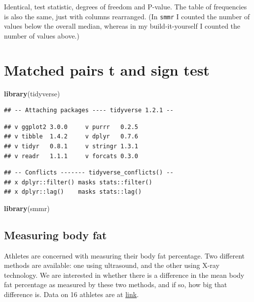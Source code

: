 \documentclass[]{tufte-book}
\newenvironment{Shaded}{}{}
\newcommand{\KeywordTok}[1]{\textcolor[rgb]{0.00,0.44,0.13}{\textbf{#1}}}
\newcommand{\NormalTok}[1]{#1}
\theoremstyle{definition}
\theoremstyle{definition}
\theoremstyle{definition}
\theoremstyle{remark}
\begin{document}
Identical, test statistic, degrees of freedom and P-value. The table of
frequencies is also the same, just with columns rearranged. (In
\texttt{smmr} I counted the number of values below the overall median,
whereas in my build-it-yourself I counted the number of values above.)

\hypertarget{matched-pairs-t-and-sign-test}{%
\chapter{Matched pairs t and sign
test}\label{matched-pairs-t-and-sign-test}}

\begin{Shaded}
\begin{Highlighting}[]
\KeywordTok{library}\NormalTok{(tidyverse)}
\end{Highlighting}
\end{Shaded}

\begin{verbatim}
## -- Attaching packages ---- tidyverse 1.2.1 --
\end{verbatim}

\begin{verbatim}
## v ggplot2 3.0.0     v purrr   0.2.5
## v tibble  1.4.2     v dplyr   0.7.6
## v tidyr   0.8.1     v stringr 1.3.1
## v readr   1.1.1     v forcats 0.3.0
\end{verbatim}

\begin{verbatim}
## -- Conflicts ------- tidyverse_conflicts() --
## x dplyr::filter() masks stats::filter()
## x dplyr::lag()    masks stats::lag()
\end{verbatim}

\begin{Shaded}
\begin{Highlighting}[]
\KeywordTok{library}\NormalTok{(smmr)}
\end{Highlighting}
\end{Shaded}

\hypertarget{measuring-body-fat}{%
\section{Measuring body fat}\label{measuring-body-fat}}

Athletes are concerned with measuring their body fat percentage. Two
different methods are available: one using ultrasound, and the other
using X-ray technology. We are interested in whether there is a
difference in the mean body fat percentage as measured by these two
methods, and if so, how big that difference is. Data on 16 athletes are
at \href{http://www.utsc.utoronto.ca/~butler/c32/bodyfat.txt}{link}.
\end{document}
